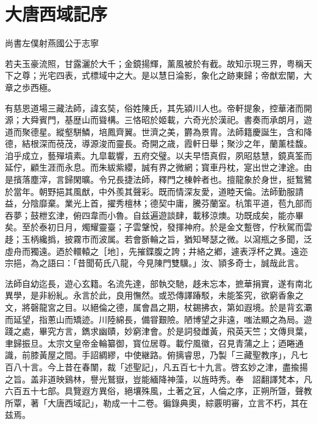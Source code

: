 
\chapter*{大唐西域記序}

\hbox{}\hfill
尚書左僕射燕國公于志寧　　

若夫玉豪流照，甘露灑於大千；金鏡揚輝，薰風被於有截。故知示現三界，粤稱天下之尊；光宅四表，式標域中之大。是以慧日淪影，象化之跡東歸；帝猷宏闡，大章之歩西極。

有慈恩道場三藏法師，諱玄奘，俗姓陳氏，其先潁川人也。帝軒提象，控華渚而開源；大舜賓門，基歴山而聳構。三恪昭於姬載，六奇光於漢祀。書奏而承朗月，遊道而聚德星。縱壑駢鱗，培鳳齊翼。世濟之美，欝為景胄。法師籍慶誕生，含和降德，結根深而䓲茂，導源浚而靈長。奇開之歳，霞軒日舉；聚沙之年，蘭薰桂馥。洎乎成立，藝殫墳素。九皐載響，五府交璧。以夫早悟真假，夙昭慈慧，鏡真筌而延佇，顧生涯而永息。而朱紱紫纓，誠有界之微網；寳車丹枕，寔出世之津途。由是擯落塵滓，言歸閑曠。令兄長捷法師，釋門之棟幹者也。擅龍象於身世，挺鶖鷺於當年。朝野挹其風猷，中外羨其聲彩。既而情深友愛，道睦天倫。法師勤服請益，分陰靡棄。業光上首，擢秀檀林；德契中庸，騰芬蘭室。杭策平道，苞九部而吞夢；鼓枻玄津，俯四韋而小魯。自兹遍遊談肆，載移涼燠。功既成矣，能亦畢矣。至於泰初日月，燭耀靈臺；子雲鞶悅，發揮神府。於是金文蹔啓，佇秋駕而雲趍；玉柄纔撝，披霧市而波属。若會斵輪之旨，猶知琴瑟之微。以瀉瓶之多聞，泛虛舟而獨遠。迺於轘轅之［地］，先摧鍱腹之誇；井絡之鄕，遽表浮杯之異。遠迩宗挹，為之語曰：「昔聞荀氏八龍，今見陳門雙驥。」汝、頴多奇士，誠哉此言。

法師自幼迄長，遊心玄籍。名流先達，部執交馳，趍未忘本，摭華捐實，遂有南北異學，是非紛糺。永言於此，良用憮然。或恐傳譯踳駁，未能筌究，欲窮香象之文，將磬龍宮之目。以絕倫之德，属會昌之期，杖錫拂衣，第如遐境。於是背玄㶚而延望，指蔥山而矯迹。川陸綿長，備甞艱險。陋博望之非遠，嗤法顯之為局。遊踐之處，畢究方言，鐫求幽賾，妙窮津會。於是詞發雌黃，飛英天竺；文傳貝葉，聿歸振旦。太宗文皇帝金輪纂御，寳位居尊。載佇風徽，召見青蒲之上；迺睠通識，前膝黃屋之間。手詔綢繆，中使継路。俯摛睿思，乃製「三藏聖教序」，凡七百八十言。今上昔在春闈，裁「述聖記」，凡五百七十九言。啓玄妙之津，盡揄揚之旨。盖非道映鷄林，譽光鷲嶽，豈能緬降神藻，以旌時秀。奉　詔翻譯梵本，凡六百五十七部。具覽遐方異俗，絕壤殊風，土著之冝，人倫之序，正朔所曁，聲教所覃，著「大唐西域記」，勒成一十二卷。徧錄典奧，綜覈明審，立言不朽，其在兹焉。

\clearpage
\setcounter{chapter}{15}
